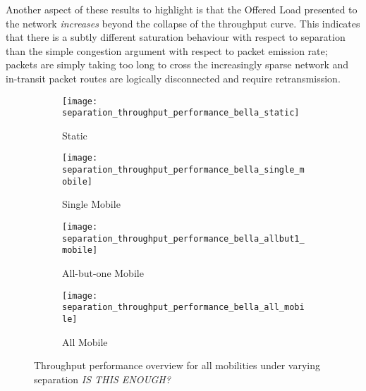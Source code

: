 Another aspect of these results to highlight is that the Offered Load presented to the network \emph{increases} beyond the collapse of the throughput curve. 
This indicates that there is a subtly different saturation behaviour with respect to separation than the simple congestion argument with respect to packet emission rate; packets are simply taking too long to cross the increasingly sparse network and in-transit packet routes are logically disconnected and require retransmission.

\begin{figure}[h]
  \begin{subfigure}[t]{0.5\textwidth}
    \centering
    \texttt{[image: separation\_throughput\_performance\_bella\_static]}
    \caption{Static}
    \label{fig:separation_throughput_performance_sum_bella_static}
  \end{subfigure}
  \begin{subfigure}[t]{0.5\textwidth}
    \centering
    \texttt{[image: separation\_throughput\_performance\_bella\_single\_mobile]}
    \caption{Single Mobile}
    \label{fig:separation_throughput_performance_sum_bella_single_mobile}
  \end{subfigure}

  \begin{subfigure}[t]{0.5\textwidth}
    \centering
    \texttt{[image: separation\_throughput\_performance\_bella\_allbut1\_mobile]}
    \caption{All-but-one Mobile}
    \label{fig:separation_throughput_performance_sum_bella_allbut1_mobile}
  \end{subfigure}  
  \begin{subfigure}[t]{0.5\textwidth}
    \centering
    \texttt{[image: separation\_throughput\_performance\_bella\_all\_mobile]}
    \caption{All Mobile}
    \label{fig:separation_throughput_performance_sum_bella_all_mobile}
  \end{subfigure}  
  \caption{Throughput performance overview for all mobilities under varying separation \emph{IS THIS ENOUGH?}}
  \label{fig:separation_all}
\end{figure}

